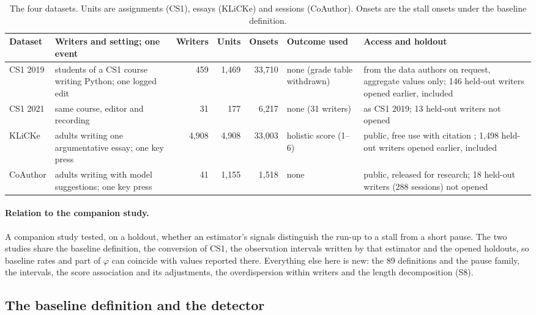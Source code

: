 \begin{table}[t]
\centering\footnotesize
\caption{The four datasets. Units are assignments (CS1), essays (KLiCKe) and sessions (CoAuthor). Onsets are the
stall onsets under the baseline definition.}
\label{tab:data}
\begin{tabularx}{\textwidth}{@{}l X r r r X X@{}}
\toprule
Dataset & Writers and setting; one event & Writers & Units & Onsets & Outcome used & Access and holdout \\
\midrule
CS1 2019 & students of a CS1 course writing Python; one logged edit & 459 & 1,469 & 33,710 & none (grade table
withdrawn) & from the data authors on request, aggregate values only; 146 held-out writers opened earlier, included \\
CS1 2021 & same course, editor and recording & 31 & 177 & 6,217 & none (31 writers) & as CS1 2019; 13 held-out
writers not opened \\
KLiCKe & adults writing one argumentative essay; one key press & 4,908 & 4,908 & 33,003 & holistic score (1--6)
& public, free use with citation \cite{inputlog2026community}; 1,498 held-out writers opened earlier, included \\
CoAuthor & adults writing with model suggestions; one key press & 41 & 1,155 & 1,518 & none & public, released for
research; 18 held-out writers (288 sessions) not opened \\
\bottomrule
\end{tabularx}
\end{table}

\paragraph{Relation to the companion study.} A companion study \cite{miura2026runup} tested, on a holdout, whether an
estimator's signals distinguish the run-up to a stall from a short pause. The two studies share the baseline
definition, the conversion of CS1, the observation intervals written by that estimator and the opened holdouts, so
baseline rates and part of $\varphi$ can coincide with values reported there. Everything else here is new: the 89
definitions and the pause family, the intervals, the score association and its adjustments, the overdispersion within
writers and the length decomposition (S8).

\subsection{The baseline definition and the detector}
\label{sec:detector}

